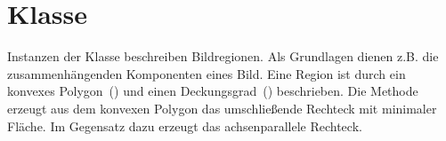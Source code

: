 \section{Klasse }
Instanzen der Klasse  beschreiben Bildregionen.
Als Grundlagen dienen z.B. die zusammenhängenden Komponenten eines Bild.
Eine Region ist durch ein konvexes Polygon~() und einen Deckungsgrad~() beschrieben.
Die Methode  erzeugt aus dem konvexen Polygon das umschließende Rechteck mit minimaler Fläche.
Im Gegensatz dazu erzeugt  das achsenparallele Rechteck.


